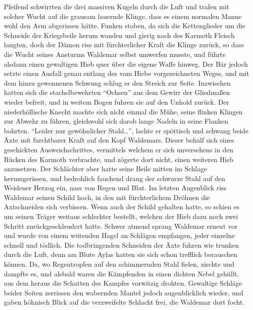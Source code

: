 Pfeifend schwirrten die drei massiven Kugeln durch die Luft und trafen mit solcher Wucht auf die grausam lauernde Klinge, dass es einem normalen Manne wohl den Arm abgerissen hätte. Funken stoben, da sich die Kettenglieder um die Schneide der Kriegsbeile herum wanden und gierig nach des Karmoth Fleisch langten, doch der Dämon riss mit fürchterlicher Kraft die Klinge zurück, so dass die Wucht seines Ansturms Waldemar selbst umwerfen musste, und führte alsdann einen gewaltigen Hieb quer über die eigene Waffe hinweg. Der Bär jedoch setzte einen Ausfall genau entlang des vom Hiebe vorgezeichneten Weges, und mit dem hinzu gewonnenen Schwung schlug er den Streich zur Seite. Inzwischen hatten sich die stachelbewehrten ``Ochsen'' aus dem Gewirr der Gliedmaßen wieder befreit, und in weitem Bogen fuhren sie auf den Unhold zurück. Der niederhöllische Knecht machte sich nicht einmal die Mühe, seine flinken Klingen zur Abwehr zu führen, gleichwohl sich darob lange Nadeln in seine Flanken bohrten. ``Leider nur gewöhnlicher Stahl\dots'', lachte er spöttisch und schwang beide Äxte mit furchtbarer Kraft auf den Kopf Waldemars. Dieser behalf sich eines geschickten Ausweichschrittes, vermittels welchem er sich unversehens in den Rücken des Karmoth verbrachte, und zögerte dort nicht, einen weiteren Hieb anzusetzen. Der Schlächter aber hatte seine Beile mitten im Schlage herumgerissen, und bedrohlich fauchend drang der schwarze Stahl auf den Weidener Herzog ein, nass von Regen und Blut. Im letzten Augenblick riss Waldemar seinen Schild hoch, in den mit fürchterlichem Dröhnen die Axtschneiden sich verbissen. Wenn auch der Schild gehalten hatte, so schien es um seinen Träger weitaus schlechter bestellt, welchen der Hieb dazu noch zwei Schritt zurückgeschleudert hatte. Schwer atmend sprang Waldemar erneut vor und wurde von einem wütenden Hagel an Schlägen empfangen, jeder einzelne schnell und tödlich. Die todbringenden Schneiden der Äxte fuhren wie trunken durch die Luft, denn am Blute Aylas hatten sie sich schon trefflich berauschen können. Da, wo Regentropfen auf den schimmernden Stahl fielen, zischte und dampfte es, und alsbald waren die Kämpfenden in einen dichten Nebel gehüllt, aus dem heraus die Schatten des Kampfes vorwitzig drohten. Gewaltige Schläge beider Seiten zerrissen den wabernden Mantel jedoch augenblicklich wieder, und gaben höhnisch Blick auf die verzweifelte Schlacht frei, die Waldemar dort focht.

